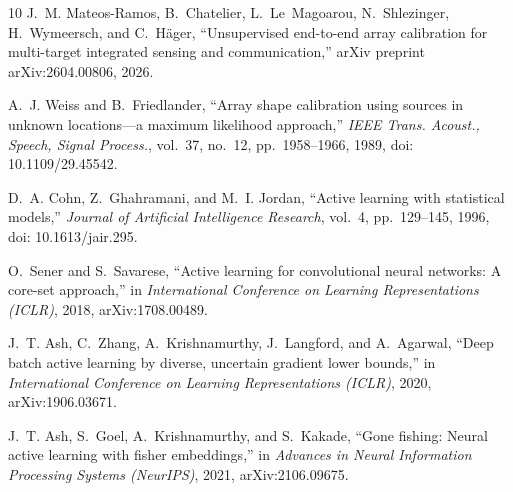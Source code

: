 \documentclass[conference]{IEEEtran}
\begin{document}
\begin{thebibliography}{10}
J.~M. Mateos-Ramos, B.~Chatelier, L.~Le~Magoarou, N.~Shlezinger, H.~Wymeersch,
  and C.~H{\"a}ger, ``Unsupervised end-to-end array calibration for
  multi-target integrated sensing and communication,'' arXiv preprint
  arXiv:2604.00806, 2026.

A.~J. Weiss and B.~Friedlander, \textquotedblleft Array shape calibration using sources in unknown locations---a maximum likelihood approach,\textquotedblright{}
\emph{IEEE Trans. Acoust., Speech, Signal Process.}, vol.~37, no.~12, pp.~1958--1966, 1989, doi: 10.1109/29.45542.

D.~A. Cohn, Z.~Ghahramani, and M.~I. Jordan, \textquotedblleft Active learning with statistical models,\textquotedblright{} \emph{Journal of Artificial Intelligence Research}, vol.~4, pp.~129--145, 1996, doi: 10.1613/jair.295.

O.~Sener and S.~Savarese, ``Active learning for convolutional neural networks:
  A core-set approach,'' in \emph{International Conference on Learning
  Representations (ICLR)}, 2018, arXiv:1708.00489.

J.~T. Ash, C.~Zhang, A.~Krishnamurthy, J.~Langford, and A.~Agarwal, ``Deep
  batch active learning by diverse, uncertain gradient lower bounds,'' in
  \emph{International Conference on Learning Representations (ICLR)}, 2020,
  arXiv:1906.03671.

J.~T. Ash, S.~Goel, A.~Krishnamurthy, and S.~Kakade, ``Gone fishing: Neural
  active learning with fisher embeddings,'' in \emph{Advances in Neural
  Information Processing Systems (NeurIPS)}, 2021, arXiv:2106.09675.

\end{thebibliography}
\end{document}
